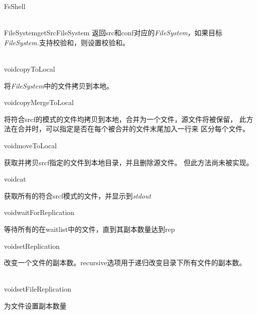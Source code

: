 \begin{XeClass}{FsShell}
\begin{XeMethod}{\XePrivate\\ }{FileSystem}{getSrcFileSystem}
 返回src和conf对应的\emph{FileSystem}，如果目标\emph{FileSystem.}支持校验和，则设置校验和。

  \end{XeMethod}

  \begin{XeMethod}{\XePrivate\\ }{void}{copyToLocal}
       
 将\emph{FileSystem}中的文件拷贝到本地。

  \end{XeMethod}

  \begin{XeMethod}{}{void}{copyMergeToLocal}
       
 将符合srcf的模式的文件均拷贝到本地，合并为一个文件，源文件将被保留，
 此方法在合并时，可以指定是否在每个被合并的文件末尾加入一行来
 区分每个文件。

  \end{XeMethod}

  \begin{XeMethod}{}{void}{moveToLocal}
       
 获取并拷贝srcf指定的文件到本地目录，并且删除源文件。
 但此方法尚未被实现。

  \end{XeMethod}

  \begin{XeMethod}{}{void}{cat}
       
 获取所有的符合srcf模式的文件，并显示到\emph{stdout}

  \end{XeMethod}

  \begin{XeMethod}{}{void}{waitForReplication}
       
 等待所有的在waitlist中的文件，直到其副本数量达到rep

  \end{XeMethod}

  \begin{XeMethod}{}{void}{setReplication}
       
 改变一个文件的副本数。recursive选项用于递归改变目录下所有文件的副本数。

  \end{XeMethod}

  \begin{XeMethod}{\XePrivate\\ }{void}{setFileReplication}
       
 为文件设置副本数量

  \end{XeMethod}


\end{XeClass}
